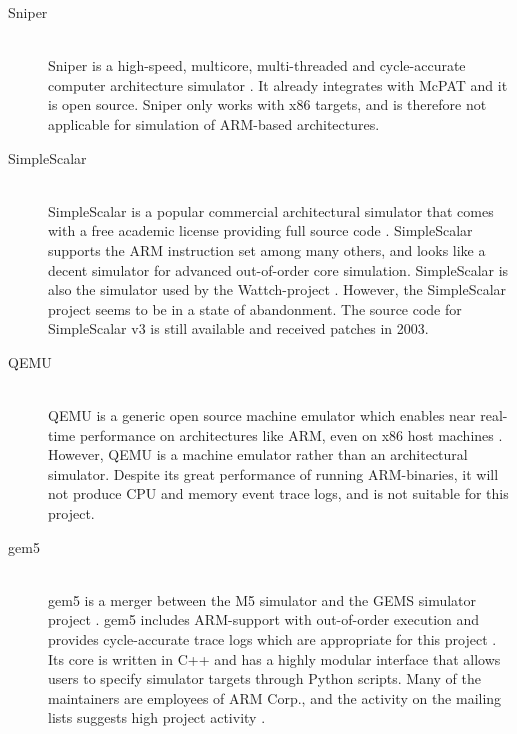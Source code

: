 \begin{description}
\item[Sniper] \hfill\\
    Sniper is a high-speed, multicore, multi-threaded and cycle-accurate
    computer architecture simulator
    \cite{sniperwebpage,carlson2011sniper,carlson2013ssomta}. It already integrates
    with McPAT \cite{li2009mcpat,li2013mcpat} and it is open source. Sniper only
    works with x86 targets, and is therefore not applicable for simulation of
    ARM-based architectures.

\item[SimpleScalar] \hfill\\
    SimpleScalar is a popular commercial architectural simulator that comes with
    a free academic license providing full source code
    \cite{burger1996evaluating,manjikian2001multiprocessor,austin2002simplescalar}.
    SimpleScalar supports the ARM instruction set among many others, and looks
    like a decent simulator for advanced out-of-order core simulation.
    SimpleScalar is also the simulator used by the Wattch-project
    \cite{brooks2000wattch}. However, the SimpleScalar project seems to be in a
    state of abandonment. The source code for SimpleScalar v3 is still available
    and received patches in 2003.

\item[QEMU]\hfill\\
    QEMU is a generic open source machine emulator which enables near real-time
    performance on architectures like ARM, even on x86 host machines
    \cite{bartholomew2006qemu,shen2010full,bellard2005qemu}. However, QEMU is a
    machine emulator rather than an architectural simulator. Despite its great
    performance of running ARM-binaries, it will not produce CPU and memory
    event trace logs, and is not suitable for this project.

\item[gem5]\hfill\\
    gem5 is a merger between the M5 simulator \cite{binkert2006m5} and the GEMS
    simulator project \cite{GEMS}. gem5 includes ARM-support with out-of-order
    execution and provides cycle-accurate trace logs which are appropriate for
    this project \cite{gem5simulator}. Its core is written in C++ and has a
    highly modular interface that allows users to specify simulator targets
    through Python scripts. Many of the maintainers are employees of ARM Corp.,
    and the activity on the mailing lists suggests high project activity
    \cite{gem5dev}.
\end{description}

